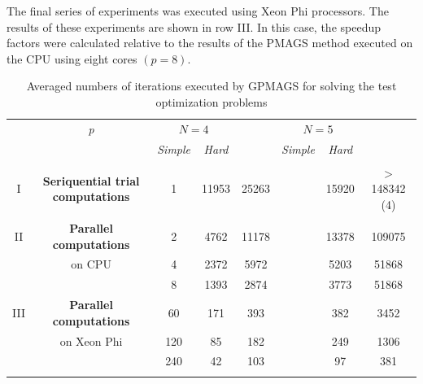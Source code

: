 \documentclass{aims}
\theoremstyle{definition}
\begin{document}
The final series of experiments was executed using Xeon Phi processors. The results
of these experiments are shown in row III. In this case, the speedup factors were
calculated relative to the results of the PMAGS method executed on the CPU using eight cores \((p=8)\).

\begin{table}
  \centering
  \label{tab:exResults}
  \caption{Averaged numbers of iterations executed by GPMAGS for solving the test optimization problems}
  \begin{tabular}{cccccccc}
    \cline{3-8}\noalign{\smallskip}
    \multicolumn{2}{c}{  } & \textit{p} & \multicolumn{2}{c}{$N=4$} & & \multicolumn{2}{c}{$N=5$}   \\
    \noalign{\smallskip} \cline{4-5} \cline{7-8}  \noalign{\smallskip}
    \multicolumn{2}{c}{  } & & \textit{Simple} & \textit{Hard} & & \textit{Simple} & \textit{Hard}  \\
    \noalign{\smallskip}\hline
    I &
    \parbox{0.25\textwidth}{
    \begin{center}
    \textbf{Seriquential trial computations}
    \end{center}		}
      & 1 & 11953 & 25263 & & 15920 & \(>\)148342 (4)  \\
    \hline \noalign{\smallskip}
II  & \textbf{Parallel computations}  %
  & 2 & 4762 & 11178 & & 13378 & 109075 \\
& on CPU & 4 & 2372 & 5972 & & 5203 & 51868 \\
&  & 8 & 1393 & 2874 & & 3773 & 51868 \\
    \noalign{\smallskip}\hline	\noalign{\smallskip}
III & \textbf{Parallel computations} %
  & 60  & 171 & 393 & & 382 & 3452  \\
& on Xeon Phi  & 120 & 85 & 182 & & 249 & 1306 \\
&  & 240 & 42 & 103 & & 97 & 381 \\

    \noalign{\smallskip}\hline
  \end{tabular}
\end{table}
\end{document}
